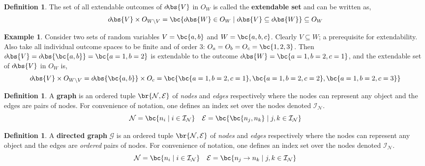 \documentclass[aps, 10pt, english, twoside, pra, longbibliography]{revtex4-1}
\theoremstyle{plain}
\theoremstyle{definition}
\newtheorem{definition}[theorem]{Definition}
\newtheorem{example}[theorem]{Example}
\theoremstyle{remark}
\newcommand{\graph}{\mathcal{G}}
\newcommand{\nodes}{\mathcal{N}}
\newcommand{\edges}{\mathcal{E}}
\newcommand{\ind}{\mathcal{I}}
\newcommand{\term}[1]{\textcolor{Mahogany}{\textbf{#1}}}
\newcommand{\outc}[1]{o\!\bs{#1}}
\begin{document}
    \begin{definition}
        The set of all extendable outcomes of $\outc{V}$ in $O_{W}$ is called the \term{extendable set} and can be written as,
        \[ \outc{V} \times O_{W\setminus V} = \bc{\outc{W} \in O_{W} \mid \outc{V} \subseteq \outc{W}} \subseteq O_{W} \]
    \end{definition}

    \begin{example}
        Consider two sets of random variables $V = \bc{a, b}$ and $W = \bc{a, b, c}$. Clearly $V \subseteq W$; a prerequisite for extendability. Also take all individual outcome spaces to be finite and of order 3: $O_a = O_b = O_c = \bc{1,2,3}$. Then $\outc{V} = \outc{\bc{a,b}} = \bc{a = 1, b = 2}$ is extendable to the outcome $\outc{W} = \bc{a = 1, b = 2, c = 1}$, and the extendable set of $\outc{V}$ in $O_{W}$ is,
        \[ \outc{V} \times O_{W\setminus V} = \outc{\bc{a,b}} \times O_c = \bc{\bc{a = 1, b = 2, c = 1}, \bc{a = 1, b = 2, c = 2}, \bc{a = 1, b = 2, c = 3}} \]
    \end{example}

    \begin{definition}
        \label{def:graph}
        A \term{graph} is an ordered tuple $\br{\nodes, \edges}$ of \textit{nodes} and \textit{edges} respectively where the nodes can represent any object and the edges are pairs of nodes. For convenience of notation, one defines an index set over the nodes denoted $\ind_\nodes$.
        \[ \nodes = \bc{n_i \mid i \in \ind_\nodes} \quad \edges = \bc{\bc{n_j, n_k} \mid j,k \in \ind_\nodes} \]
    \end{definition}

    \begin{definition}
        \label{def:directed_graph}
        A \term{directed graph} $\graph$ is an ordered tuple $\br{\nodes, \edges}$ of \textit{nodes} and \textit{edges} respectively where the nodes can represent any object and the edges are \textit{ordered} pairs of nodes. For convenience of notation, one defines an index set over the nodes denoted $\ind_\nodes$.
        \[ \nodes = \bc{n_i \mid i \in \ind_\nodes} \quad \edges = \bc{n_j \to n_k \mid j,k \in \ind_\nodes} \]
    \end{definition}
\end{document}
